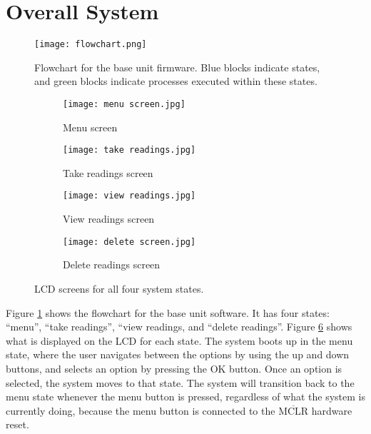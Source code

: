 \section{Overall System}
\begin{figure}[htb]
	\centering
	\texttt{[image: flowchart.png]}
	\caption{Flowchart for the base unit firmware. Blue blocks indicate states, and green blocks indicate processes executed within these states.}
	\label{fig: flowchart}
\end{figure}

\begin{figure}[htb]
	\centering
	\begin{subfigure}[b]{0.4\linewidth}
		\texttt{[image: menu screen.jpg]}
		\caption{Menu screen}
		\label{fig: menu screen}
	\end{subfigure}
	\begin{subfigure}[b]{0.4\linewidth}
		\texttt{[image: take readings.jpg]}
		\caption{Take readings screen}
		\label{fig: take readings screen}
	\end{subfigure}
	\begin{subfigure}[b]{0.4\linewidth}
		\texttt{[image: view readings.jpg]}
		\caption{View readings screen}
		\label{fig: view readings screen}
	\end{subfigure}
	\begin{subfigure}[b]{0.4\linewidth}
		\texttt{[image: delete screen.jpg]}
		\caption{Delete readings screen}
		\label{fig: delete readings screen}
	\end{subfigure}
	\caption{LCD screens for all four system states.}
	\label{fig: lcd screens}
\end{figure}

Figure \ref{fig: flowchart} shows the flowchart for the base unit software. It has four states: ``menu'', ``take readings'', ``view readings, and ``delete readings''. Figure \ref{fig: lcd screens} shows what is displayed on the LCD for each state. The system boots up in the menu state, where the user navigates between the options by using the up and down buttons, and selects an option by pressing the OK button. Once an option is selected, the system moves to that state. The system will transition back to the menu state whenever the menu button is pressed, regardless of what the system is currently doing, because the menu button is connected to the $\overline{\text{MCLR}}$ hardware reset.\\

